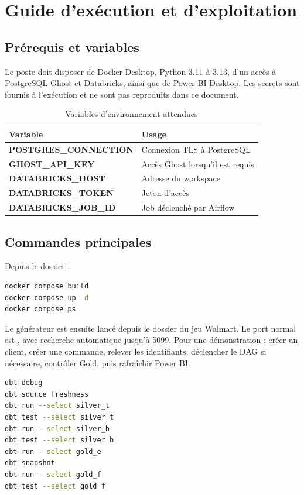\chapter{Guide d'exécution et d'exploitation}

\section{Prérequis et variables}
Le poste doit disposer de Docker Desktop, Python 3.11 à 3.13, d'un accès à PostgreSQL Ghost et Databricks, ainsi que de Power BI Desktop. Les secrets sont fournis à l'exécution et ne sont pas reproduits dans ce document.

\begin{table}[htbp]
\centering
\caption{Variables d'environnement attendues}
\label{tab:env-vars}
\small
\begin{tabularx}{\textwidth}{>{\bfseries}p{5.2cm}X}
\toprule
Variable & Usage \\
\midrule
POSTGRES\_CONNECTION & Connexion TLS à PostgreSQL \\
GHOST\_API\_KEY & Accès Ghost lorsqu'il est requis \\
DATABRICKS\_HOST & Adresse du workspace \\
DATABRICKS\_TOKEN & Jeton d'accès \\
DATABRICKS\_JOB\_ID & Job déclenché par Airflow \\
\bottomrule
\end{tabularx}
\end{table}

\section{Commandes principales}
Depuis le dossier  :

\begin{lstlisting}[language=bash,caption={Démarrage Docker}]
docker compose build
docker compose up -d
docker compose ps
\end{lstlisting}

Le générateur est ensuite lancé depuis le dossier du jeu Walmart. Le port normal est , avec recherche automatique jusqu'à 5099. Pour une démonstration : créer un client, créer une commande, relever les identifiants, déclencher le DAG si nécessaire, contrôler Gold, puis rafraîchir Power BI.

\begin{lstlisting}[language=bash,caption={Commandes dbt de contrôle}]
dbt debug
dbt source freshness
dbt run --select silver_t
dbt test --select silver_t
dbt run --select silver_b
dbt test --select silver_b
dbt run --select gold_e
dbt snapshot
dbt run --select gold_f
dbt test --select gold_f
\end{lstlisting}

